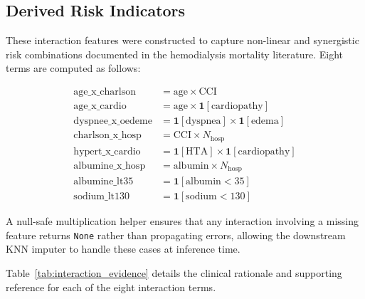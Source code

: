 \documentclass[12pt,a4paper,twoside]{report}
\begin{document}

\FloatBarrier
\subsection{Derived Risk Indicators}
\label{sec:interaction_features}

These interaction features were constructed to capture non-linear and synergistic risk combinations documented in the hemodialysis mortality literature. Eight terms are computed as follows:

\begin{align}
\text{age\_x\_charlson} &= \text{age} \times \text{CCI} \label{eq:int1}\\
\text{age\_x\_cardio} &= \text{age} \times \mathbf{1}[\text{cardiopathy}] \label{eq:int2}\\
\text{dyspnee\_x\_oedeme} &= \mathbf{1}[\text{dyspnea}] \times \mathbf{1}[\text{edema}] \label{eq:int3}\\
\text{charlson\_x\_hosp} &= \text{CCI} \times N_{\text{hosp}} \label{eq:int4}\\
\text{hypert\_x\_cardio} &= \mathbf{1}[\text{HTA}] \times \mathbf{1}[\text{cardiopathy}] \label{eq:int5}\\
\text{albumine\_x\_hosp} &= \text{albumin} \times N_{\text{hosp}} \label{eq:int6}\\
\text{albumine\_lt35} &= \mathbf{1}[\text{albumin} < 35] \label{eq:int7}\\
\text{sodium\_lt130} &= \mathbf{1}[\text{sodium} < 130] \label{eq:int8}
\end{align}

A null-safe multiplication helper ensures that any interaction involving a missing feature returns \texttt{None} rather than propagating errors, allowing the downstream KNN imputer to handle these cases at inference time.

Table~\ref{tab:interaction_evidence} details the clinical rationale and supporting reference for each of the eight interaction terms.
\end{document}
